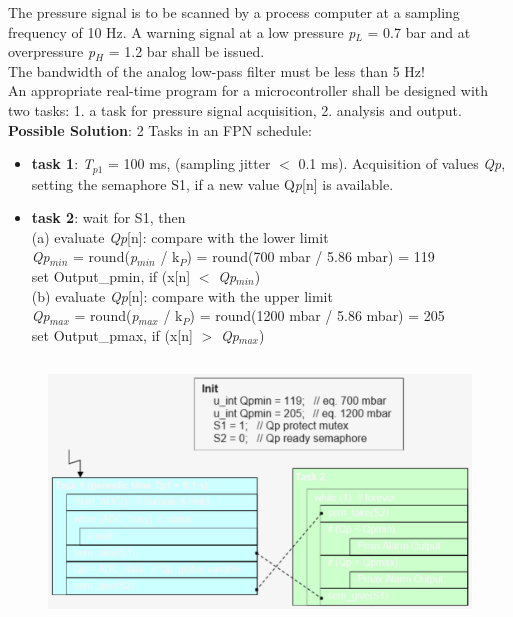 The pressure signal is to be scanned by a process computer at a sampling frequency of 10 Hz. A warning signal at a low pressure \textit{p}${}_{L}$ = 0.7 bar and at overpressure \textit{p}${}_{H}$ = 1.2 bar shall be issued.\\

The bandwidth of the analog low-pass filter must be less than 5 Hz!\\

An appropriate real-time program for a microcontroller shall be designed with two tasks: 1. a task for pressure signal acquisition, 2. analysis and output.\\

\textbf{Possible Solution}: 2 Tasks in an FPN schedule:\\

\begin{itemize}
\item \textbf{task 1}:  \textit{T}${}_{p1}$ = 100 ms, (sampling jitter $<$  0.1 ms). Acquisition of values \textit{Qp}, setting the semaphore S1, if a new value Q\textit{p}[n] is available.

\item \textbf{task 2}:  wait for S1, then \\
(a) evaluate \textit{Qp}[n]:  compare with the lower limit\\
\textit{Qp}${}_{min}$ = round(\textit{p}${}_{min}$ / k${}_{P}$) = round(700 mbar / 5.86 mbar) = 119\\
set Output\_pmin, if (x[n] $\mathrm{<}$ \textit{Qp}${}_{min}$)\\

(b) evaluate \textit{Qp}[n]: compare with the upper limit  \\  \textit{Qp}${}_{max}$ = round(\textit{p}${}_{max}$ / k${}_{P}$) = round(1200 mbar / 5.86 mbar) = 205 \\ set Output\_pmax, if (x[n] $\mathrm{>}$ \textit{Qp}${}_{max}$)
\end{itemize}

    \begin{figure}[h]
    \centering
    \includegraphics[width=12cm, height=7cm]{Images/image142.png}
    \label{fig:Fig }
    \end{figure}

